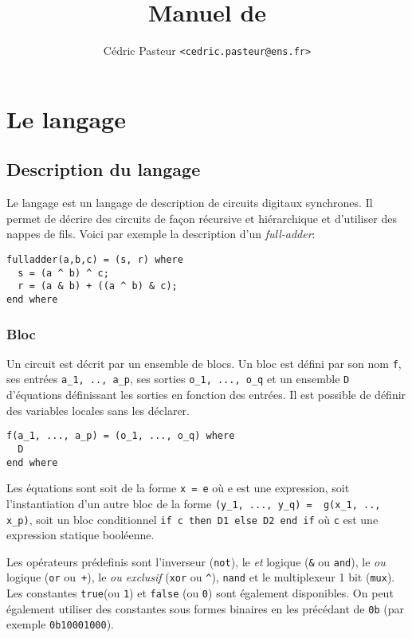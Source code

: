 \documentclass[a4paper]{article}
\title{Manuel de \minijazz{}}
\author{Cédric Pasteur \texttt{<cedric.pasteur@ens.fr>}}
\begin{document}
\maketitle

\section{Le langage \minijazz}

\subsection{Description du langage}

Le langage \minijazz{} est un langage de description de circuits digitaux synchrones. Il permet de décrire des circuits de façon récursive et hiérarchique et d'utiliser des nappes de fils. Voici par exemple la description d'un \emph{full-adder}:
\begin{lstlisting}
fulladder(a,b,c) = (s, r) where
  s = (a ^ b) ^ c;
  r = (a & b) + ((a ^ b) & c);
end where
\end{lstlisting}

\subsubsection*{Bloc}

Un circuit est décrit par un ensemble de blocs. Un bloc est défini par son nom \texttt{f}, ses entrées \lstinline{a_1, .., a_p}, ses sorties \lstinline{o_1, ..., o_q} et un ensemble \texttt{D} d'équations définissant les sorties en fonction des entrées. Il est possible de définir des variables locales sans les déclarer.
\begin{lstlisting}
f(a_1, ..., a_p) = (o_1, ..., o_q) where
  D
end where
\end{lstlisting}

Les équations sont soit de la forme \lstinline+x = e+ où e est une expression, soit l'instantiation d'un autre bloc de la forme \lstinline+(y_1, ..., y_q) =  g(x_1, .., x_p)+, soit un bloc conditionnel \lstinline+if c then D1 else D2 end if+ où \lstinline+c+ est une expression statique booléenne.

Les opérateurs prédefinis sont l'inverseur (\lstinline+not+), le \emph{et} logique (\lstinline+&+ ou \lstinline+and+), le \emph{ou} logique (\lstinline+or+ ou~\lstinline{+}), le \emph{ou exclusif} (\lstinline+xor+ ou \lstinline+^+), \lstinline+nand+ et le multiplexeur 1 bit (\lstinline+mux+). Les constantes \lstinline+true+(ou \texttt{1}) et \lstinline+false+ (ou \texttt{0}) sont également disponibles. On peut également utiliser des constantes sous formes binaires en les précédant de \verb+0b+ (par exemple \verb+0b10001000+).
\end{document}
